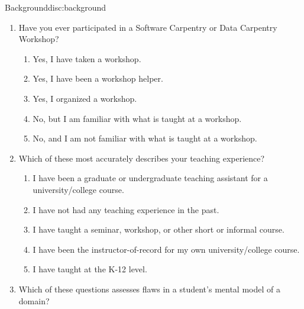 \begin{discussion}{Background}{disc:background}

\begin{enumerate}

\item
  Have you ever participated in a Software Carpentry or Data Carpentry Workshop?

  \begin{enumerate}
  \item
    Yes, I have taken a workshop.
  \item
    Yes, I have been a workshop helper.
  \item
    Yes, I organized a workshop.
  \item
    No, but I am familiar with what is taught at a workshop.
  \item
    No, and I am not familiar with what is taught at a workshop.
  \end{enumerate}

\item
  Which of these most accurately describes your teaching experience?

  \begin{enumerate}
  \item
    I have been a graduate or undergraduate teaching assistant for a
    university/college course.
  \item
    I have not had any teaching experience in the past.
  \item
    I have taught a seminar, workshop, or other short or informal course.
  \item
    I have been the instructor-of-record for my own university/college
    course.
  \item
    I have taught at the K-12 level.
  \end{enumerate}

\item
  Which of these questions assesses flaws in a student's mental model of a domain?


\end{enumerate}
\end{discussion}
